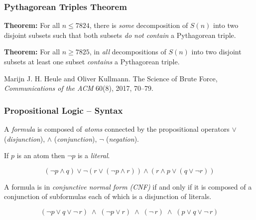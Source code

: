 \documentclass{beamer}
\begin{document}

\begin{frame}
\frametitle{Pythagorean Triples Theorem}

\textbf{Theorem:}
For all $n\leq 7824$, there is \emph{some} decomposition of $S(n)$ into two disjoint subsets such that both subsets \emph{do not contain} a Pythagorean triple.

\bigskip

\textbf{Theorem:}
For all $n\geq 7825$, in \emph{all} decompositions of $S(n)$ into two disjoint subsets at least one subset \emph{contains} a Pythagorean triple.

\bigskip

Marijn J. H. Heule and Oliver Kullmann. The Science of Brute Force, \textit{Communications of the ACM} 60(8), 2017, 70--79.

\end{frame}


\begin{frame}
\frametitle{Propositional Logic -- Syntax}

A \emph{formula} is composed of \emph{atoms} connected by the propositional operators $\vee$ (\emph{disjunction}), $\wedge$ (\emph{conjunction}), $\neg$ (\emph{negation}).

\smallskip

If $p$ is an atom then $\neg p$ is a \emph{literal}.

\[
(\neg p \wedge q) \vee \neg(r \vee (\neg p \wedge r))
\wedge (r \wedge p \vee (q \vee \neg r))
\]

\pause

\bigskip

A formula is in \emph{conjunctive normal form (CNF)} if and only if it is composed of a conjunction of subformulas each of which is a disjunction of literals.

\[
(\neg p \vee q \vee \neg \,r) \;\wedge\; (\neg p \vee r)
\;\wedge\; (\neg \,r)\;\wedge\;(p \vee q \vee \neg \,r)
\]

\end{frame}

\end{document}
